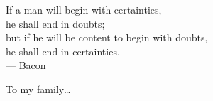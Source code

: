 \cleardoublepage
\thispagestyle{empty}


\vspace*{3cm}

\begin{raggedleft}
    If a man will begin with certainties,  \\
    he shall end in doubts;\\
    but if he will be content to begin with doubts,\\
    he shall end in certainties.\\
     --- Bacon \\
\end{raggedleft}

\vspace{4cm}

\begin{center}
    To my family\dots
\end{center}


